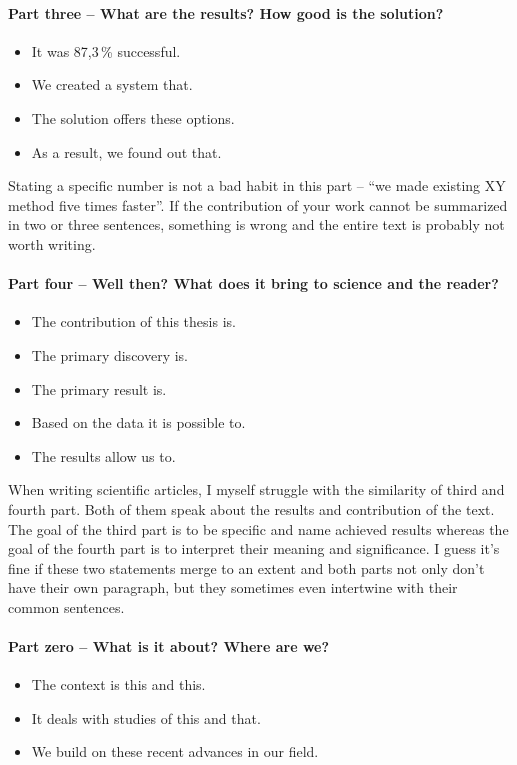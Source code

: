 \paragraph{Part three -- What are the results? How good is the solution?}
\begin{itemize}
  \item{It was 87,3\,\% successful.}
  \item{We created a system that.}
  \item{The solution offers these options.}
  \item{As a result, we found out that.}
\end{itemize}

Stating a specific number is not a bad habit in this part -- ``we made existing XY method five times faster''. If the contribution of your work cannot be summarized in two or three sentences, something is wrong and the entire text is probably not worth writing.

\paragraph{Part four -- Well then? What does it bring to science and the reader?}
\begin{itemize}
  \item{The contribution of this thesis is.}
  \item{The primary discovery is.}
  \item{The primary result is.}
  \item{Based on the data it is possible to.}
  \item{The results allow us to.}
\end{itemize}

When writing scientific articles, I myself struggle with the similarity of third and fourth part. Both of them speak about the results and contribution of the text. The goal of the third part is to be specific and name achieved results whereas the goal of the fourth part is to interpret their meaning and significance. I guess it's fine if these two statements merge to an extent and both parts not only don't have their own paragraph, but they sometimes even intertwine with their common sentences.

\paragraph{Part zero -- What is it about? Where are we?}
\begin{itemize}
  \item{The context is this and this.}
  \item{It deals with studies of this and that.}
  \item{We build on these recent advances in our field.}
\end{itemize}

